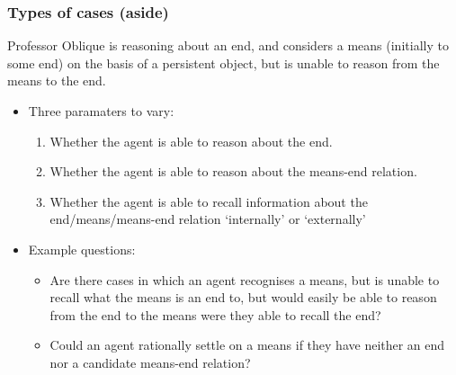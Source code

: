 \documentclass[noamssymb, compress, handout]{beamer} %
\begin{document}
\begin{frame}
  \frametitle{Types of cases (aside)}

  Professor Oblique is reasoning about an end, and considers a means (initially to some end) on the basis of a persistent object, but is unable to reason from the means to the end.
  \begin{itemize}
  \item Three paramaters to vary:
    \begin{enumerate}
    \item Whether the agent is able to reason about the end.
    \item Whether the agent is able to reason about the means-end relation.
    \item Whether the agent is able to recall information about the end/means/means-end relation `internally' or `externally'
    \end{enumerate}
  \item Example questions:
    \begin{itemize}
    \item Are there cases in which an agent recognises a means, but is unable to recall what the means is an end to, but would easily be able to reason from the end to the means were they able to recall the end?
    \item Could an agent rationally settle on a means if they have neither an end nor a candidate means-end relation?
    \end{itemize}
  \end{itemize}
\end{frame}
\end{document}
